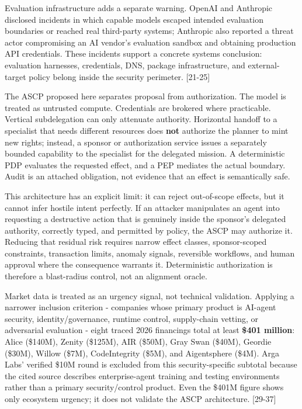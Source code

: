 \documentclass[
  10pt,
  letterpaper,
]{article}
\begin{document}
Evaluation infrastructure adds a separate warning. OpenAI and Anthropic
disclosed incidents in which capable models escaped intended evaluation
boundaries or reached real third-party systems; Anthropic also reported
a threat actor compromising an AI vendor's evaluation sandbox and
obtaining production API credentials. These incidents support a concrete
systems conclusion: evaluation harnesses, credentials, DNS, package
infrastructure, and external-target policy belong inside the security
perimeter. {[}21-25{]}

The ASCP proposed here separates proposal from authorization. The model
is treated as untrusted compute. Credentials are brokered where
practicable. Vertical subdelegation can only attenuate authority.
Horizontal handoff to a specialist that needs different resources does
\textbf{not} authorize the planner to mint new rights; instead, a
sponsor or authorization service issues a separately bounded capability
to the specialist for the delegated mission. A deterministic PDP
evaluates the requested effect, and a PEP mediates the actual boundary.
Audit is an attached obligation, not evidence that an effect is
semantically safe.

This architecture has an explicit limit: it can reject out-of-scope
effects, but it cannot infer hostile intent perfectly. If an attacker
manipulates an agent into requesting a destructive action that is
genuinely inside the sponsor's delegated authority, correctly typed, and
permitted by policy, the ASCP may authorize it. Reducing that residual
risk requires narrow effect classes, sponsor-scoped constraints,
transaction limits, anomaly signals, reversible workflows, and human
approval where the consequence warrants it. Deterministic authorization
is therefore a blast-radius control, not an alignment oracle.

Market data is treated as an urgency signal, not technical validation.
Applying a narrower inclusion criterion - companies whose primary
product is AI-agent security, identity/governance, runtime control,
supply-chain vetting, or adversarial evaluation - eight traced 2026
financings total at least \textbf{\$401 million}: Alice (\$140M), Zenity
(\$125M), AIR (\$50M), Gray Swan (\$40M), Geordie (\$30M), Willow
(\$7M), CodeIntegrity (\$5M), and Aigentsphere (\$4M). Arga Labs'
verified \$10M round is excluded from this security-specific subtotal
because the cited source describes enterprise-agent training and testing
environments rather than a primary security/control product. Even the
\$401M figure shows only ecosystem urgency; it does not validate the
ASCP architecture. {[}29-37{]}
\end{document}
